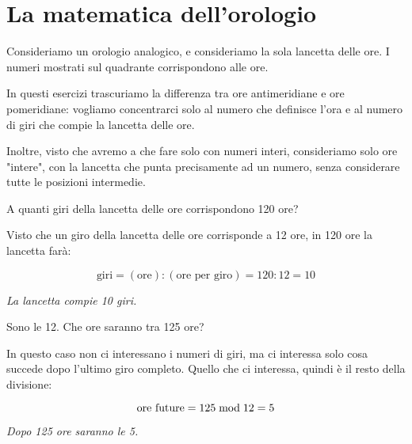 \chapter{La matematica dell'orologio}

Consideriamo un orologio analogico, e consideriamo la sola lancetta delle ore. I numeri mostrati sul quadrante corrispondono alle ore.

In questi esercizi trascuriamo la differenza tra ore antimeridiane e ore pomeridiane: vogliamo concentrarci solo al numero che definisce l'ora e al numero di giri che compie la lancetta delle ore.

Inoltre, visto che avremo a che fare solo con numeri interi, consideriamo solo ore "intere", con la lancetta che punta precisamente ad un numero, senza considerare tutte le posizioni intermedie. 

    \begin{esercizio}
        A quanti giri della lancetta delle ore corrispondono 120 ore?
    \end{esercizio}
    \begin{soluzione}
        Visto che un giro della lancetta delle ore corrisponde a 12 ore, in 120 ore la lancetta farà:
        
        \begin{equation*}
            \text{giri} = (\text{ore}) : (\text{ore per giro}) = 120 : 12 = 10
        \end{equation*}
        
        \emph{La lancetta compie 10 giri.}
    \end{soluzione}

\begin{esercizio}
    Sono le 12. Che ore saranno tra 125 ore?
\end{esercizio}
\begin{soluzione}
    In questo caso non ci interessano i numeri di giri, ma ci interessa solo cosa succede dopo l'ultimo giro completo. Quello che ci interessa, quindi è il resto della divisione:
    
    \begin{equation*}
        \text{ore future} = 125  \bmod  12 = 5
    \end{equation*}
    
    \emph{Dopo 125 ore saranno le 5.}
\end{soluzione}

